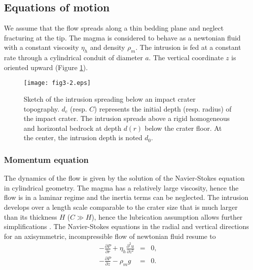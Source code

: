 \subsection{Equations of motion}
	
We assume that the flow spreads along a thin bedding plane and neglect
fracturing  at the  tip.   The  magma is  considered  to  behave as  a
newtonian  fluid   with  a   constant  viscosity  $\eta_h$   and  density
$\rho_{m}$.   The  intrusion is  fed  at  a  constant rate  through  a
cylindrical conduit of  diameter $a$.  The vertical  coordinate $z$ is
oriented upward (Figure \ref{C5-fig3-2}).

\begin{figure}[h!]
  \graphicspath{ {/Users/thorey/Documents/These/Submission/Article/FFC_JGR_2013/Paper_APRES_2nd_REVIEW/} }
  \begin{center}
    \texttt{[image: fig3-2.eps]}
    \caption{Sketch of the intrusion  spreading below an impact crater
      topography.  $d_c$  (resp.  $C$) represents the  initial depth
      (resp. radius) of the impact crater. The intrusion spreads above
      a rigid  homogeneous and horizontal bedrock  at depth $d(r)$
      below the  crater floor. At  the center, the intrusion  depth is
      noted $d_0$.}
    \label{C5-fig3-2}
  \end{center}
\end{figure}

 	
\subsubsection{Momentum equation}
\label{C5-Equation_Momentum}
	
The dynamics of the flow is given by the solution of the Navier-Stokes
equation in  cylindrical geometry.  The  magma has a  relatively large
viscosity, hence the flow is in a laminar regime and the inertia terms
can  be  neglected.   The  intrusion  develops  over  a  length  scale
comparable to the  crater size that is much larger  than its thickness
$H$  ($C \gg  H$),  hence the  lubrication  assumption allows  further
simplifications       \citep{Huppert:1982a,Michaut:2009jx}.        The
Navier-Stokes equations in  the radial and vertical  directions for an
axisymmetric, incompressible flow of newtonian fluid resume to
\begin{eqnarray}
  -\frac{\partial P}{\partial r} + \eta_h \frac{\partial^{2}u}{\partial z^{2}} &=&0\label{C5-eq4}, \\
  -\frac{\partial P}{\partial z} - \rho_{m}g& =&0.
                                                 \label{C5-eq5}
\end{eqnarray}

